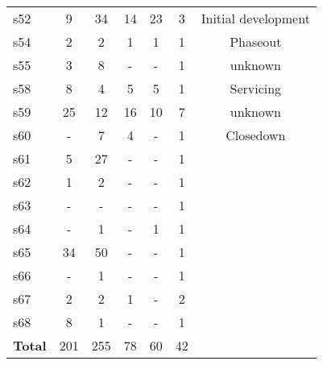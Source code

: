 \begin{longtable}{| l | c c | c c c | c |}
s52 &
  9 &
  34 &
  14 &
  23 &
  3 &
  Initial development \\
s54 &
  2 &
  2 &
  1 &
  1 &
  1 &
  Phaseout \\
s55 &
  3 &
  8 &
  - &
  - &
  1 &
  unknown \\
s58 &
  8 &
  4 &
  5 &
  5 &
  1 &
  Servicing \\
s59 &
  25 &
  12 &
  16 &
  10 &
  7 &
  unknown \\
s60 &
  - &
  7 &
  4 &
  - &
  1 &
  Closedown \\
s61 &
  5 &
  27 &
  - &
  - &
  1 &
   \\
s62 &
  1 &
  2 &
  - &
  - &
  1 &
   \\
s63 &
  - &
  - &
  - &
  - &
  1 &
   \\
s64 &
  - &
  1 &
  - &
  1 &
  1 &
   \\
s65 &
  34 &
  50 &
  - &
  - &
  1 &
   \\
s66 &
  - &
  1 &
  - &
  - &
  1 &
   \\
s67 &
  2 &
  2 &
  1 &
  - &
  2 &
   \\
s68 &
  8 &
  1 &
  - &
  - &
  1 &
   \\
  \hline
{\bf Total} &
  201 &
  255 &
  78 &
  60 &
  42 &
     \\
  \hline
\end{longtable}
